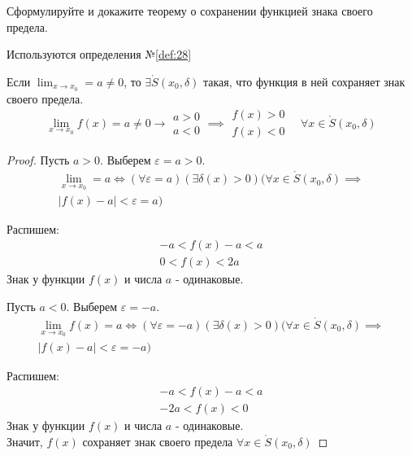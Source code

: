 \begin{question}
    Сформулируйте и докажите теорему о сохранении функцией знака своего предела.
\end{question}
\begin{used}
    Используются определения №\ref{def:28}
\end{used}
\begin{theorem}
    Если $\lim_{x \to x_0} = a \neq 0$, то $\exists \mathring{S}(x_0, \delta)$ такая, что функция в ней сохраняет знак своего предела. \[
        \lim_{x \to x_0} f(x) = a \neq 0 \to 
        \begin{matrix}
            a > 0 \\
            a < 0
        \end{matrix}
        \implies 
        \begin{matrix}
            f(x) > 0 \\
            f(x) < 0
        \end{matrix}
        \quad
        \forall x \in \mathring{S}(x_0, \delta)
    \] 
\end{theorem}
\begin{proof}
    Пусть $a > 0$. Выберем  $\varepsilon = a > 0$.
    \begin{gather*}
        \lim_{x \to x_0} = a \iff (\forall \varepsilon = a)(\exists  \delta(x) > 0) (\forall x \in \mathring{S}(x_0, \delta) \implies \\
        |f(x)- a| < \varepsilon = a) 
    \end{gather*}

      Распишем:
    \begin{gather*}
        -a < f(x) - a < a \\
        \boxed{0 < f(x) < 2a}
    \end{gather*}
    Знак у функции $f(x)$ и числа $a$ - одинаковые.

    Пусть $a < 0$. Выберем  $\varepsilon = -a$.
    \begin{gather*}
        \lim_{x \to x_0} f(x) = a \iff (\forall \varepsilon = -a)(\exists  \delta(x) > 0) (\forall x \in \mathring{S}(x_0, \delta) \implies \\
        |f(x) - a| < \varepsilon = -a) 
    \end{gather*}

    Распишем:
    \begin{gather*}
        -a < f(x) - a < a \\
        \boxed{-2a < f(x) < 0}
    \end{gather*}
    Знак у функции $f(x)$ и числа  $a$ - одинаковые.
    \\
    Значит, $f(x)$ сохраняет знак своего предела  $\forall x \in \mathring{S}(x_0, \delta)$ 
\end{proof}



